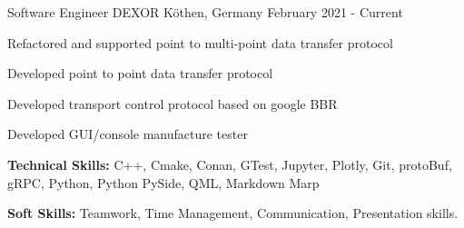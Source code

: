 

\begin{cventries}

  \cventry
    {Software Engineer} %
    {DEXOR} %
    {Köthen, Germany} %
    {February 2021 - Current} %
    {
      \begin{cvitems} %
        \item {Refactored and supported point to multi-point data transfer protocol}
        \item {Developed point to point data transfer protocol}
        \item {Developed transport control protocol based on google BBR}
        \item {Developed GUI/console manufacture tester}
        \item {\textbf{Technical Skills:} C++, Cmake, Conan, GTest, Jupyter, Plotly, Git, protoBuf, gRPC, Python, Python PySide, QML, Markdown Marp}
        \item {\textbf{Soft Skills:} Teamwork, Time Management, Communication, Presentation skills.}
      \end{cvitems}
    }


\end{cventries}
